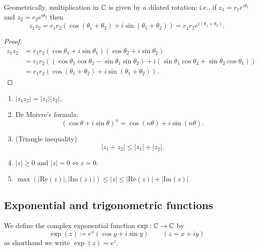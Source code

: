 \documentclass[10pt, a4paper]{article}
\begin{document}
\begin{lemma}
    Geometrically,
    multiplication in $\mathbb{C}$ is given by a dilated rotation;
    i.e.,
    if $z_1 = r_1e ^ {i\theta_1}$ and $z_2 = r_2e ^ {i\theta_2}$ then
    \[
    z_1z_2 = r_1r_2(\cos(\theta_1 + \theta_2) + i\sin(\theta_1 + \theta_2)) = r_1r_2e ^ {i(\theta_1 + \theta_2)}.
    \]

    \begin{proof}
        \begin{align*}
            z_1z_2 &= r_1r_2(\cos{\theta_1} + i\sin{\theta_1})(\cos{\theta_2} + i\sin{\theta_2}) \\
            &= r_1r_2((\cos{\theta_1}\cos{\theta_2} - \sin{\theta_1}\sin{\theta_2}) + i(\sin{\theta_1}\cos{\theta_2} + \sin{\theta_2}\cos{\theta_1})) \\
            &= r_1r_2(\cos(\theta_1 + \theta_2) + i\sin(\theta_1 + \theta_2)).
        \end{align*}
    \end{proof}
\end{lemma}

\begin{corollary}
    \begin{enumerate}[label = \arabic*.]
        \item $|z_1z_2| = |z_1||z_2|$,

        \item De Moivre's formula:
        \[
        (\cos{\theta} + i\sin{\theta}) ^ n = \cos(n\theta) + i\sin(n\theta).
        \]

        \item
        (Triangle inequality)
        \[
        |z_1 + z_2| \leq |z_1| + |z_2|.
        \]

        \item $|z| \geq 0$ and $|z| = 0 \iff z = 0$.

        \item $\max(|\mathrm{Re}(z)|, |\mathrm{Im}(z)|) \leq |z| \leq |\mathrm{Re}(z)| + |\mathrm{Im}(z)|$.
    \end{enumerate}
\end{corollary}

\subsection{Exponential and trigonometric functions}

\begin{definition}
    We define the complex exponential function $\exp : \mathbb{C} \to \mathbb{C}$ by
    \[
    \exp(z) \coloneqq e ^ x(\cos{y} + i\sin{y})\qquad(z = x + iy)
    \]
    as shorthand we write $\exp(z) = e ^ z$.
\end{definition}
\end{document}
